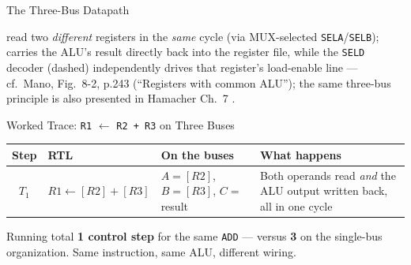 \documentclass[aspectratio=169]{beamer}
\begin{document}
\begin{frame}{The Three-Bus Datapath}
\begin{center}
  \end{center}
   read two \emph{different} registers in the \emph{same}
  cycle (via MUX-selected \texttt{SELA}/\texttt{SELB});  carries the
  ALU's result directly back into the register file, while the \texttt{SELD}
  decoder (dashed) independently drives that register's load-enable line ---
  cf.\ Mano, Fig.~8-2, p.243 (``Registers with common ALU''); the same
  three-bus principle is also presented in Hamacher Ch.~7
  \cite{Mano1993_computer_system_architecture,Hamacher2002_computer_organization}.
\end{frame}

\begin{frame}{Worked Trace: \texttt{R1} $\gets$ \texttt{R2 + R3} on Three Buses}
  \footnotesize
  \begin{tabular}{@{}cp{3.4cm}p{2.6cm}p{4.6cm}@{}}
    \toprule
    \textbf{Step} & \textbf{RTL} & \textbf{On the buses} & \textbf{What happens} \\
    \midrule
    $T_1$ & $R1 \gets [R2] + [R3]$ & $A{=}[R2]$, $B{=}[R3]$,
      $C{=}$result &
      Both operands read \emph{and} the ALU output written back, all in one cycle \\
    \bottomrule
  \end{tabular}
  \vspace{0.3cm}
  \begin{alertblock}{Running total}
    \textbf{1 control step} for the same \texttt{ADD} --- versus \textbf{3} on the
    single-bus organization. Same instruction, same ALU, different wiring.
  \end{alertblock}
\end{frame}
\end{document}
